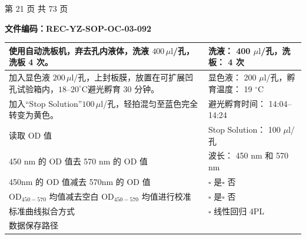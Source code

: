 \documentclass[UTF8,10pt,a4paper,fontset=fandol]{ctexart}
\newcommand{\fieldvalue}[1]{#1}
\newcommand{\handwritten}[1]{#1}
\begin{document}
\begin{center}
\begin{center}
\vfill
\begin{center}
第 21 页 共 73 页
\end{center}

\newpage

\begin{center}
\textbf{文件编码：REC-YZ-SOP-OC-03-092}
\end{center}

\begin{tabularx}{\textwidth}{|p{}|X|}
\hline
使用自动洗板机，弃去孔内液体，洗液 $400\,\mu\mathrm{l}$/孔，洗板 4 次。&
洗液：
\fieldvalue{\handwritten{400}} $\mu\mathrm{l}$/孔，洗板：
\fieldvalue{\handwritten{4}} 次\\
\hline
加入显色液 $200\,\mu\mathrm{l}$/孔，上封板膜，放置在可扩展凹孔试验箱内，$18$--$20^\circ\mathrm{C}$避光孵育 $30$ 分钟。&
显色液：
\fieldvalue{\handwritten{200}} $\mu\mathrm{l}$/孔，孵育温度：
\fieldvalue{\handwritten{19}} $^\circ\mathrm{C}$\\
\hline
加入“Stop Solution”$100\,\mu\mathrm{l}$/孔，轻拍混匀至蓝色完全转变为黄色。&
避光孵育时间：
\fieldvalue{\handwritten{14:04--14:24}}\\
\hline
读取 OD 值&
Stop Solution：
\fieldvalue{\handwritten{100}} $\mu\mathrm{l}$/孔\\
\hline
450 nm 的 OD 值去 570 nm 的 OD 值&
波长：
\fieldvalue{\handwritten{450}} nm 和
\fieldvalue{\handwritten{570}} nm\\
\hline
450nm 的 OD 值减去 570nm 的 OD 值&
$\square$ 是\quad $\square$ 否\\
\hline
OD$_{450-570}$ 均值减去空白 OD$_{450-570}$ 均值进行校准&
$\square$ 是\quad $\square$ 否\\
\hline
标准曲线拟合方式&
$\square$ 线性回归\quad
\fieldvalue{4PL}\\
\hline
数据保存路径&

\end{tabularx}
\end{center}
\end{center}
\end{document}
